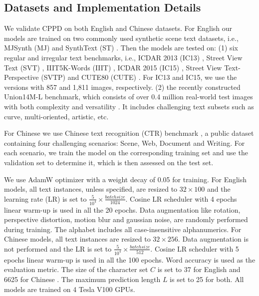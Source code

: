 \documentclass[10pt,journal,compsoc]{IEEEtran}
\begin{document}
\subsection{Datasets and Implementation Details}
We validate CPPD on both English and Chinese datasets. For English our models are trained on two commonly used synthetic scene text datasets, i.e., MJSynth (MJ) \cite{jaderberg14synthetic, Jader2015Reading} and SynthText (ST) \cite{Synthetic}. Then the models are tested on: (1) six regular and irregular text benchmarks, i.e., ICDAR 2013 (IC13) \cite{icdar2013}, Street View Text (SVT) \cite{Wang2011SVT}, IIIT5K-Words (IIIT) \cite{IIIT5K}, ICDAR 2015 (IC15) \cite{icdar2015}, Street View Text-Perspective (SVTP) \cite{SVTP} and CUTE80 (CUTE) \cite{Risnumawan2014cute}. For IC13 and IC15, we use the versions with 857 and 1,811 images, respectively. (2) the recently constructed Union14M-L benchmark, which consists of over 0.4 million real-world test images with both complexity and versatility \cite{jiang2023revisiting}. It includes challenging text subsets such as curve, multi-oriented, artistic, etc. 

For Chinese we use Chinese text recognition (CTR) benchmark \cite{chen2021benchmarking}, a public dataset containing four challenging scenarios: Scene, Web, Document and Writing. For each scenario, we train the model on the corresponding training set and use the validation set to determine it, which is then assessed on the test set.


We use AdamW optimizer \cite{adamw} with a weight decay of 0.05 for training. For English models, all text instances, unless specified, are resized to $32 \times 100$ and the learning rate (LR) is set to $\frac{5}{10^{4}} \times \frac{batchsize}{1024}$. Cosine LR scheduler \cite{cosine} with 4 epochs linear warm-up is used in all the 20 epochs. 
Data augmentation like rotation, perspective distortion, motion blur and gaussian noise, are randomly performed during training. The alphabet includes all case-insensitive alphanumerics. For Chinese models, all text instances are resized to $32 \times 256$. Data augmentation is not performed and the LR is set to $\frac{5}{10^{4}} \times \frac{batchsize}{512}$. Cosine LR scheduler with 5 epochs linear warm-up is used in all the 100 epochs. Word accuracy is used as the evaluation metric. The size of the character set $C$ is set to 37 for English and 6625 for Chinese \cite{ppocrv3}. The maximum prediction length $L$ is set to 25 for both. All models are trained on 4 Tesla V100 GPUs.
\end{document}

